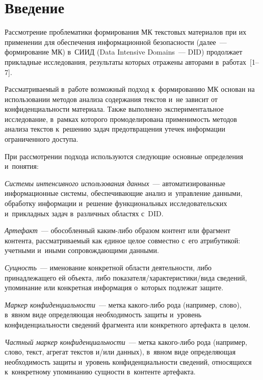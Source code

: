 \begin{multicols}{2}

\label{st\stat}

\section{Введение}

\vspace*{-2pt}

  Рассмотрение проблематики формирования МК
текстовых материалов при их применении для обеспечения информационной 
безопас\-ности (далее~--- формирование МК) 
в~СИИД (Data Intensive Domains~--- DID) 
продолжает прикладные исследования, результаты которых отражены 
авторами  
в~работах~[1--7].
   
  Рассматриваемый в~работе возможный подход к~формированию МК
   основан на использовании методов анализа содержания 
текстов и~не зависит от конфиденциальности материала. Также выполнено 
экспериментальное исследование, в~рамках которого промоделирована 
применимость методов анализа текстов к~решению задач предотвращения 
утечек информации ограниченного доступа.
  
  При рассмотрении подхода используются следующие основные 
определения и~понятия: 
  
  \textit{Системы интенсивного использования данных}~--- 
автоматизированные информационные системы, обеспечивающие анализ  
и~управ\-ле\-ние данными, обработку информации и~решение 
функциональных исследовательских и~прикладных задач в~различных 
областях с~DID. 
  
  \textit{Артефакт}~--- обособленный каким-либо образом контент или 
фрагмент контента, рас\-смат\-ри\-ва\-емый как единое целое совместно с~его 
атрибутикой: учетными и~иными сопровождающими данными. 
  
  \textit{Сущность}~--- именование конкретной области деятельности, либо 
принадлежащего ей объекта, либо по\-ка\-за\-те\-ля/ха\-рак\-те\-ри\-сти\-ки/ви\-да 
сведений, упоминание или конкретная информация о~которых подлежат 
защите.
  
  \textit{Маркер конфиденциальности}~--- метка ка\-ко\-го-либо рода 
(например, слово), в~явном виде определяющая необходимость защиты 
и~уровень конфиденциальности сведений фрагмента или \mbox{конкретного} артефакта в~целом.
  
  \textit{Частный маркер конфиденциальности}~--- метка какого-ли\-бо 
рода (например, слово, текст, агрегат текстов и/или данных), в~явном виде 
опре\-деляющая необходимость защиты и~уровень конфиденциальности 
сведений, относящихся к~{конкретному} упоминанию сущности в~контенте 
артефакта.
  

\end{multicols}
